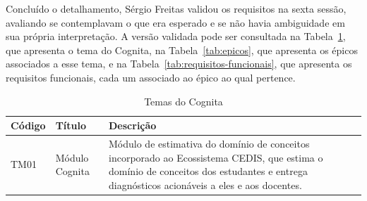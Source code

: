 Concluído o detalhamento, Sérgio Freitas validou os requisitos na sexta sessão, avaliando se contemplavam o que era esperado e se não havia ambiguidade em sua própria interpretação. A versão validada pode ser consultada na Tabela~\ref{tab:temas}, que apresenta o tema do Cognita, na Tabela~\ref{tab:epicos}, que apresenta os épicos associados a esse tema, e na Tabela~\ref{tab:requisitos-funcionais}, que apresenta os requisitos funcionais, cada um associado ao épico ao qual pertence.

\begin{table}[H]
\caption{Temas do Cognita}
\label{tab:temas}
\centering
\begin{tabularx}{\textwidth}{l>{\raggedright\arraybackslash}p{3.2cm}>{\raggedright\arraybackslash}X}
\hline
\textbf{Código} & \textbf{Título} & \textbf{Descrição} \\
\hline
TM01 & Módulo Cognita & Módulo de estimativa do domínio de conceitos incorporado ao Ecossistema CEDIS, que estima o domínio de conceitos dos estudantes e entrega diagnósticos acionáveis a eles e aos docentes. \\
\hline
\end{tabularx}
\end{table}

